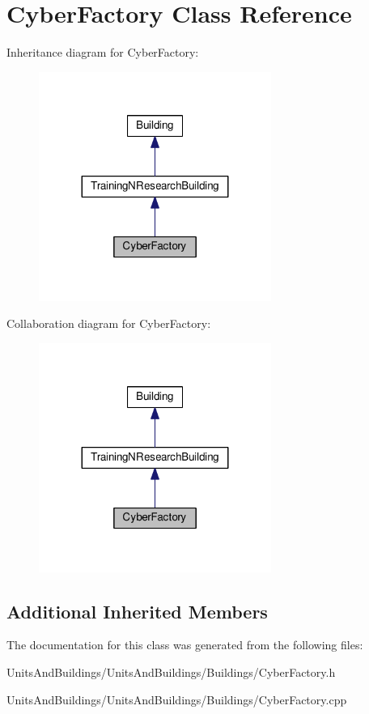 \hypertarget{class_cyber_factory}{}\section{Cyber\+Factory Class Reference}
\label{class_cyber_factory}


Inheritance diagram for Cyber\+Factory\+:
\nopagebreak
\begin{figure}[H]
\begin{center}
\leavevmode
\includegraphics[width=215pt]{class_cyber_factory__inherit__graph}
\end{center}
\end{figure}


Collaboration diagram for Cyber\+Factory\+:
\nopagebreak
\begin{figure}[H]
\begin{center}
\leavevmode
\includegraphics[width=215pt]{class_cyber_factory__coll__graph}
\end{center}
\end{figure}
\subsection*{Additional Inherited Members}


The documentation for this class was generated from the following files\+:\begin{DoxyCompactItemize}
\item 
Units\+And\+Buildings/\+Units\+And\+Buildings/\+Buildings/Cyber\+Factory.\+h\item 
Units\+And\+Buildings/\+Units\+And\+Buildings/\+Buildings/Cyber\+Factory.\+cpp\end{DoxyCompactItemize}
